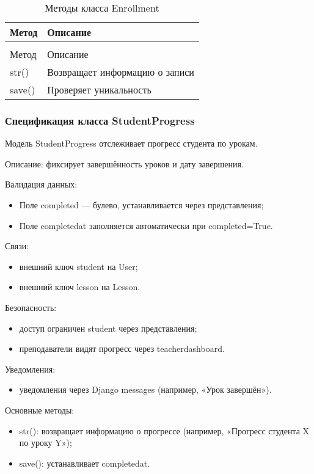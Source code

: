 \begin{xltabular}{\textwidth}{|l|X|}
	\caption{Методы класса Enrollment\label{tab:enrollment_methods}}\\
	\hline
	Метод & Описание \\ \hline
	\endfirsthead
	\\
	\hline
	Метод & Описание \\ \hline
	\endhead
	str() & Возвращает информацию о записи \\ \hline
	save() & Проверяет уникальность \\ \hline
\end{xltabular}

\subsubsection{Спецификация класса StudentProgress}

Модель StudentProgress отслеживает прогресс студента по урокам.


Описание: фиксирует завершённость уроков и дату завершения.

Валидация данных:
	\begin{itemize}
		\item Поле completed — булево, устанавливается через представления;
		\item Поле completedat заполняется автоматически при completed=True.
	\end{itemize}
	
Связи:
	\begin{itemize}
		\item внешний ключ student на User;
		\item внешний ключ lesson на Lesson.
	\end{itemize}
	
Безопасность:
	\begin{itemize}
		\item доступ ограничен student через представления;
		\item преподаватели видят прогресс через teacherdashboard.
	\end{itemize}
	
Уведомления:
	\begin{itemize}
		\item уведомления через Django messages (например, «Урок завершён»).
	\end{itemize}
	
Основные методы:
	\begin{itemize}
		\item str(): возвращает информацию о прогрессе (например, «Прогресс студента X по уроку Y»);
		\item save(): устанавливает completedat.
	\end{itemize}
	
